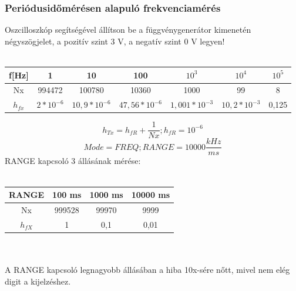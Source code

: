 \documentclass[10pt,a4paper]{article}
\begin{document}
		\subsubsection{Periódusidőmérésen alapuló frekvenciamérés}
		Oszcilloszkóp segítségével állítson be a függvénygenerátor kimenetén
négyszögjelet, a pozitív szint 3 V, a negatív szint 0 V legyen!
		\\\\
		\begin{tabular}{|c|c|c|c|c|c|c|}
		\hline 
		f[Hz] & 1 & 10 & 100 & $10^3$ & $10^4$ & $10^5$ \\ 
		\hline 
		Nx & 994472 & 100780 & 10360 & 1000 & 99 & 8 \\ 
		\hline 
		$h_{fx}$ & $2*10^{-6}$ & $10,9*10^{-6}$ & $47,56*10^{-6}$ & $1,001*10^{-3}$ & $10,2*10^{-3}$ & 0,125 \\ 
		\hline 
		\end{tabular} 
		$$h_{Tx} = h_{fR} + \frac{1}{Nx}; h_{fR} = 10^{-6}$$
		$$Mode=FREQ; RANGE=10000 \frac{kHz}{ms}$$
		RANGE kapcsoló 3 állásának mérése:\\\\
		\begin{tabular}{|c|c|c|c|}
		\hline 
		RANGE & 100 ms & 1000 ms & 10000 ms \\ 
		\hline 
		Nx & 999528 & 99970 & 9999 \\ 
		\hline 
		$h_{fX}$ & 1 & 0,1 & 0,01 \\ 
		\hline 
		\end{tabular} 
		\\\\A RANGE kapcsoló legnagyobb állásában a hiba 10x-sére nőtt, mivel nem elég digit a kijelzéshez.
\tableofcontents
\end{document}
